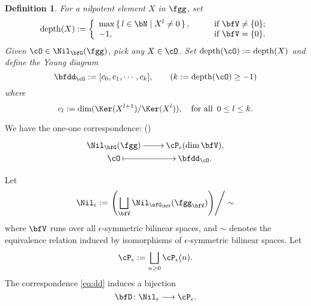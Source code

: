 \documentclass[12pt,a4paper]{amsart}
\newcommand{\depth}{\mathrm{depth}}
\def\abs#1{\left|{#1}\right|}
\numberwithin{equation}{section}
\newtheorem{defn}[thm]{Definition}
\theoremstyle{remark}
\def\NilGC{\Nil_{\bfG}(\fgg)}
\begin{document}
\begin{defn}\label{def:NilC}For a nilpotent element $X$ in $\fgg$, set
\begin{equation}\label{eq:E.depth}
\depth(X):=\left\{
                 \begin{array}{ll}
                 \max\set{l\in \bN| X^l \neq 0}, \qquad &\textrm{if $\bfV\neq \{0\}$}; \\ %
                 -1, &\textrm{if $\bfV=\{0\}$}.
                 \end{array}
                 \right.
\end{equation}
Given $\cO\in \NilGC$, pick any $X\in \cO$.
Set $\depth(\cO) := \depth(X)$ and define the Young diagram
\[
\bfdd_\cO:=[c_0,c_1,\cdots, c_k],
  \qquad (k:=\depth(\cO)\geq -1)
\]
where %
$$c_l := \dim (\Ker(X^{l+1})/\Ker(X^{l})), \quad \textrm{for all  }\,
0\leq l\leq k.
$$
\end{defn}

We have the one-one correspondence: (\cite[Chapter 5]{CM})
\begin{equation}\label{eq:dd}
\xymatrix@R=0em{
\Nil_{\bfG}(\fgg) \ar[r]& \cP_{\epsilon}(\dim \bfV),\\
 \cO \ar@{|->}[r]& \bfdd_\cO.
}
\end{equation}



Let
\[
\Nil_{\epsilon} := \left.\left( \bigsqcup_{\bfV} \Nil_{\sfG_{\bfV}}(\fgg_{\bfV})\right)\right/\sim
\]
where $\bfV$ runs over all $\epsilon$-symmetric bilinear spaces, and $\sim$ denotes the
equivalence relation induced by isomorphisms of $\epsilon$-symmetric bilinear
spaces.
Let
\[
\cP_{\epsilon} := \bigsqcup_{n\geq 0} \cP_{\epsilon}(n).
\]
The correspondence \cref{eq:dd}
induces a bijection
\[
\bfD\colon \Nil_{\epsilon}\longrightarrow \cP_{\epsilon}.
\]


\end{document}

